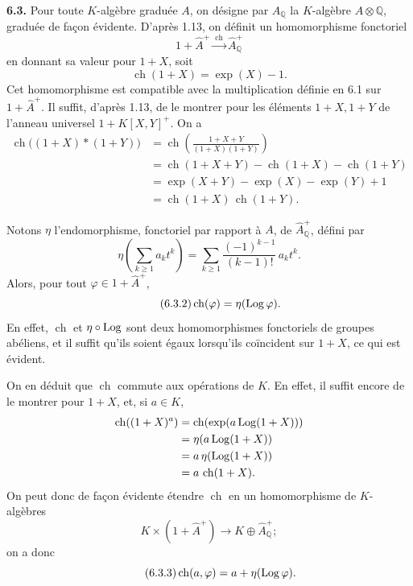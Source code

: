 \documentclass[11pt]{article}
\newcommand{\ch}{\operatorname{ch}}
\providecommand{\ch}{\operatorname{ch}}
\begin{document}
\textbf{6.3.} Pour toute \(K\)-algèbre graduée \(A\), on désigne par \(A_{\mathbb Q}\) la \(K\)-algèbre \(A\otimes\mathbb Q\), graduée de façon évidente. D'après 1.13, on définit un homomorphisme fonctoriel
\[
  1+\widehat A^+\xrightarrow{\ \ch\ }\widehat A_{\mathbb Q}^{+}
\]
en donnant sa valeur pour \(1+X\), soit
\begin{equation}\tag{6.3.1}
  \ch(1+X)=\exp(X)-1.
\end{equation}
Cet homomorphisme est compatible avec la multiplication définie en 6.1 sur \(1+\widehat A^+\). Il suffit, d'après 1.13, de le montrer pour les éléments \(1+X,1+Y\) de l'anneau universel \(1+K[X,Y]^+\). On a
\[
\begin{aligned}
 \ch\bigl((1+X)*(1+Y)\bigr)
 &= \ch\!\left(\frac{1+X+Y}{(1+X)(1+Y)}\right)\\
 &= \ch(1+X+Y)-\ch(1+X)-\ch(1+Y)\\
 &= \exp(X+Y)-\exp(X)-\exp(Y)+1\\
 &= \ch(1+X)\,\ch(1+Y).
\end{aligned}
\]

Notons \(\eta\) l'endomorphisme, fonctoriel par rapport à \(A\), de \(\widehat A_{\mathbb Q}^{+}\), défini par
\[
 \eta\!\left(\sum_{k\ge1} a_k t^k\right)
 =
 \sum_{k\ge1}\frac{(-1)^{k-1}}{(k-1)!}\,a_k t^k.
\]
Alors, pour tout \(\varphi\in1+\widehat A^+\),
\begin{equation}\tag{6.3.2}
  \ch(\varphi)=\eta(\Log\varphi).
\end{equation}
En effet, \(\ch\) et \(\eta\circ\operatorname{Log}\) sont deux homomorphismes fonctoriels de groupes abéliens, et il suffit qu'ils soient égaux lorsqu'ils coïncident sur \(1+X\), ce qui est évident.

On en déduit que \(\ch\) commute aux opérations de \(K\). En effet, il suffit encore de le montrer pour \(1+X\), et, si \(a\in K\),
\[
\begin{aligned}
 \ch((1+X)^a)
 &=\ch(\exp(a\Log(1+X)))\\
 &=\eta(a\Log(1+X))\\
 &=a\,\eta(\Log(1+X))\\
 &=a\,\ch(1+X).
\end{aligned}
\]
On peut donc de façon évidente étendre \(\ch\) en un homomorphisme de \(K\)-algèbres
\[
  K\times(1+\widehat A^+)\longrightarrow K\oplus\widehat A_{\mathbb Q}^{+};
\]
on a donc
\begin{equation}\tag{6.3.3}
  \ch(a,\varphi)=a+\eta(\Log\varphi).
\end{equation}
\end{document}
